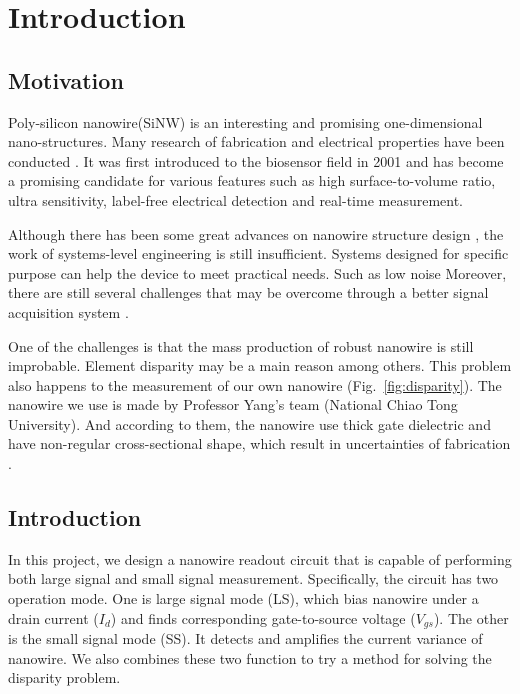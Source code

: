\chapter{Introduction}
\section{Motivation}
Poly-silicon nanowire(SiNW) is an interesting and promising one-dimensional nano-structures.
Many research of fabrication and electrical properties have been conducted \cite{C25th}.
It was first introduced to the biosensor field in 2001\cite{C2001} and has become a promising candidate for various features such as high surface-to-volume ratio, ultra sensitivity, label-free electrical detection and  real-time measurement.

Although there has been some great advances on nanowire structure design \cite{R1}, the work of systems-level engineering is still insufficient.
Systems designed for specific purpose can help the device to meet practical needs.
{\color{red}Such as low noise }
Moreover, there are still several challenges that may be overcome through a better signal acquisition system \cite{R1}.

One of the challenges is that the mass production of robust nanowire is still improbable.
Element disparity may be a main reason among others.
This problem also happens to the measurement of our own nanowire (Fig.~\ref{fig:disparity}).
The nanowire we use is made by Professor Yang's team (National Chiao Tong University).
And according to them, the nanowire use thick gate dielectric and have non-regular cross-sectional shape, which result in uncertainties of fabrication \cite{C6}.


\section{Introduction}
In this project, we design a nanowire readout circuit that is capable of performing both large signal and small signal measurement.
Specifically, the circuit has two operation mode.
One is large signal mode (LS), which bias nanowire under a drain current ($I_d$) and finds corresponding gate-to-source voltage ($V_{gs}$).
The other is the small signal mode (SS).
It detects and amplifies the current variance of nanowire.
We also combines these two function to try a method for solving the disparity problem.

